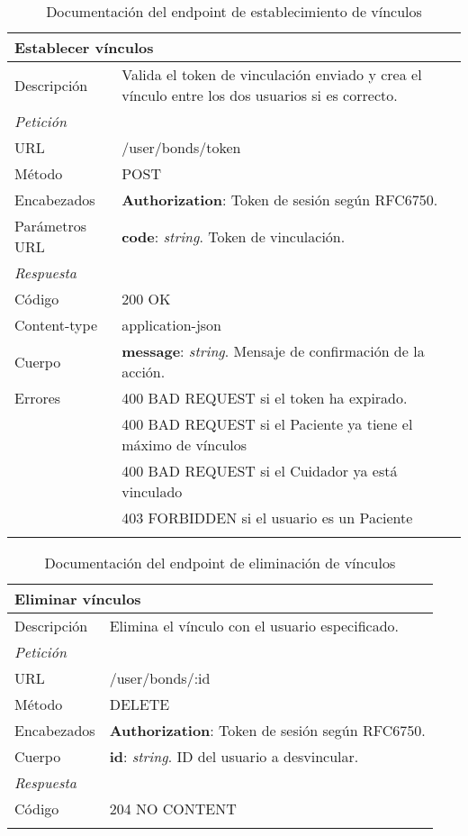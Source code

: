\newpage
\begin{longtable}{|p{} p{}|}
    \hline
    \multicolumn{2}{|l|}{\textbf{Establecer vínculos}} \\ \hline 
    Descripción         & Valida el token de vinculación enviado y crea el vínculo entre los dos usuarios si es correcto. \\ \hline \hline
    \multicolumn{2}{|l|}{\emph{Petición}}  \\ \hline 
    URL      & /user/bonds/token \\ \hline
    Método   & POST                  \\ \hline
    Encabezados  & 
    \textbf{Authorization}: Token de sesión según RFC6750. \\ \hline
    Parámetros URL  & 
    \textbf{code}: \emph{string}. Token de vinculación. \\ \hline \hline
    \multicolumn{2}{|l|}{\emph{Respuesta}} \\ \hline 
    Código          & 200 OK         \\ \hline
    Content-type    & application-json  \\ \hline
    Cuerpo  & 
    \textbf{message}: \emph{string}. Mensaje de confirmación de la acción. \\ \hline \hline
    Errores & 400 BAD REQUEST si el token ha expirado. \\
            & 400 BAD REQUEST si el Paciente ya tiene el máximo de vínculos \\
            & 400 BAD REQUEST si el Cuidador ya está vinculado \\
            & 403 FORBIDDEN si el usuario es un Paciente
    \\ \hline
    \caption{Documentación del endpoint de establecimiento de vínculos}
    \label{api:establecer_vinculo}
\end{longtable}

\begin{longtable}{|p{} p{}|}
    \hline
    \multicolumn{2}{|l|}{\textbf{Eliminar vínculos}} \\ \hline 
    Descripción         & Elimina el vínculo con el usuario especificado. \\ \hline \hline
    \multicolumn{2}{|l|}{\emph{Petición}}  \\ \hline 
    URL      & /user/bonds/:id \\ \hline
    Método   & DELETE                  \\ \hline
    Encabezados  & 
    \textbf{Authorization}: Token de sesión según RFC6750. \\ \hline
    Cuerpo  & 
    \textbf{id}: \emph{string}. ID del usuario a desvincular. \\ \hline \hline
    \multicolumn{2}{|l|}{\emph{Respuesta}} \\ \hline 
    Código          & 204 NO CONTENT         \\ \hline \hline
    \caption{Documentación del endpoint de eliminación de vínculos}
    \label{api:eliminar_vinculo}
\end{longtable}


